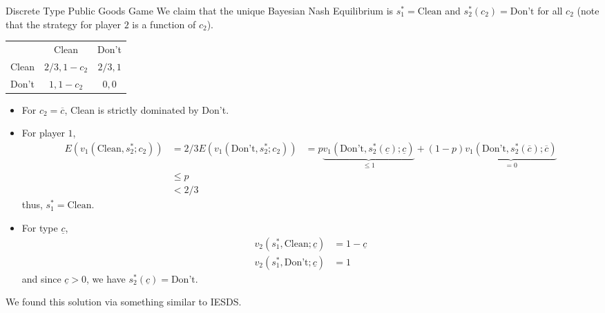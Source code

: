 \documentclass[10pt]{extarticle}
\begin{document}
\begin{problem}{Discrete Type Public Goods Game}
    We claim that the unique Bayesian Nash Equilibrium is $s_1^{\ast} = \text{Clean}$ and $s_{2}^{\ast}(c_2) = \text{Don't}$ for all $c_2$ (note that the strategy for player $2$ is a function of $c_2$).
    \begin{center}
      \renewcommand{\arraystretch}{1.5}
      \begin{tabular}{c|c|c|}
        \multicolumn{1}{c}{} & \multicolumn{1}{c}{Clean} & \multicolumn{1}{c}{Don't}\\
        \cline{2-3}
        Clean & $2/3,1-c_2$ & $2/3,1$\\
        \cline{2-3}
        Don't & $1,1-c_2$ & $0,0$\\
        \cline{2-3}
      \end{tabular}
    \end{center}
    \begin{itemize}
      \item For $c_2 = \overline{c}$, Clean is strictly dominated by Don't.
      \item For player $1$,
        \begin{align*}
          E\left(v_1(\text{Clean},s_2^{\ast};c_2)\right) &= 2/3
          E\left(v_1(\text{Don't},s_{2}^{\ast};c_2)\right) &= p\underbrace{v_1(\text{Don't},s_2^{\ast}( \underline{c} );\underline{c})}_{\leq 1} + (1-p)\underbrace{v_1(\text{Don't},s_2^{\ast}( \overline{c} ); \overline{c})}_{=0}\\
                                              &\leq p\\
                                              &< 2/3
        \end{align*}
        thus, $s_1^{\ast} = \text{Clean}$.
      \item For type $ \underline{c} $,
        \begin{align*}
          v_2(s_1^{\ast},\text{Clean}; \underline{c}) &= 1- \underline{c}\\
          v_2(s_1^{\ast},\text{Don't}; \underline{c}) &= 1
        \end{align*}
        and since $ \underline{c} > 0 $, we have $s_2^{\ast}( \underline{c} ) = \text{Don't}$.
    \end{itemize}
    We found this solution via something similar to IESDS.
  \end{problem}
\end{document}
